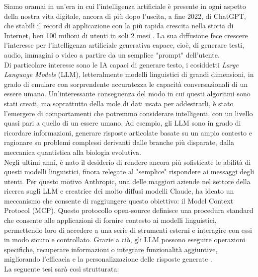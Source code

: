 ﻿Siamo oramai in un'era in cui l'intelligenza artificiale è presente in ogni aspetto della nostra vita digitale,
ancora di più dopo l'uscita, a fine 2022, di ChatGPT, che stabilì il record di applicazione con la più rapida crescita nella storia di Internet,
ben 100 milioni di utenti in soli 2 mesi \cite{ubs2023latest}. La sua diffusione fece crescere l'interesse per l'intelligenza
artificiale generativa capace, cioè, di generare testi, audio, immagini o video a partire da un semplice "prompt" dell'utente. \\
Di particolare interesse sono le IA capaci di generare testo, i cosiddetti \textit{Large Language Models} (LLM), letteralmente modelli linguistici
di grandi dimensioni, in grado di emulare con sorprendente accuratezza le capacità conversazionali di un essere umano. Un'interessante
conseguenza del modo in cui questi algoritmi sono stati creati, ma soprattutto della mole di dati usata per addestrarli, è stato l'emergere
di comportamenti che potremmo considerare intelligenti, con un livello quasi pari a quello di un essere umano. Ad esempio, gli LLM sono
in grado di ricordare informazioni, generare risposte articolate basate su un ampio contesto e ragionare su problemi complessi derivanti
dalle branche più disparate, dalla meccanica quantistica alla biologia evolutiva. \\
Negli ultimi anni, è nato il desiderio di rendere ancora più sofisticate le abilità di questi modelli linguistici, finora relegate al
"semplice" rispondere ai messaggi degli utenti. Per questo motivo Anthropic, una delle maggiori aziende nel settore della ricerca sugli LLM
e creatrice dei molto diffusi modelli Claude, ha ideato un meccanismo che consente di raggiungere questo obiettivo: il Model Context Protocol (MCP).
Questo protocollo open-source definisce una procedura standard che consente alle applicazioni di fornire contesto ai modelli linguistici,
permettendo loro di accedere a una serie di strumenti esterni e interagire con essi in modo sicuro e controllato. Grazie a ciò, gli LLM possono
eseguire operazioni specifiche, recuperare informazioni o integrare funzionalità aggiuntive, migliorando l'efficacia e la personalizzazione
delle risposte generate \cite{modelcontextprotocol2024}. \\
La seguente tesi sarà così strutturata:
